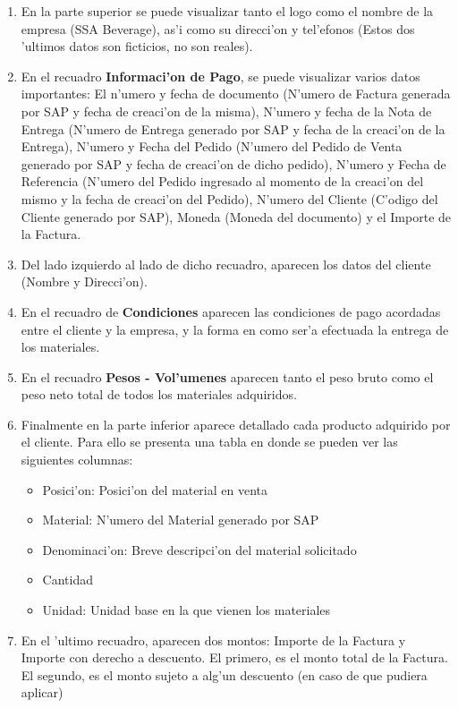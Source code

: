 \begin{enumerate}
\item En la parte superior se puede visualizar tanto el logo como el nombre de la empresa (SSA Beverage), as'i como su direcci'on y tel'efonos (Estos dos 'ultimos datos son ficticios, no son reales).
\item En el recuadro \textbf{Informaci'on de Pago}, se puede visualizar varios datos importantes: El n'umero y fecha de documento (N'umero de Factura generada por SAP y fecha de creaci'on de la misma), N'umero y fecha de la Nota de Entrega (N'umero de Entrega generado por SAP y fecha de la  creaci'on de la Entrega), N'umero y Fecha del Pedido (N'umero del Pedido de Venta generado por SAP y fecha de creaci'on de dicho pedido), N'umero  y Fecha de Referencia (N'umero del Pedido ingresado al momento de la creaci'on del mismo y la fecha de creaci'on del Pedido), N'umero del  Cliente (C'odigo del Cliente generado por SAP), Moneda (Moneda del documento) y el Importe de la Factura.
\item Del lado izquierdo al lado de dicho recuadro, aparecen los datos del cliente (Nombre y Direcci'on).
\item En el recuadro de \textbf{Condiciones} aparecen las condiciones de pago acordadas entre el cliente y la empresa, y la forma en como ser'a efectuada la entrega de los materiales.
\item  En el recuadro \textbf{Pesos - Vol'umenes} aparecen tanto el peso bruto como el peso neto total de todos los materiales adquiridos.
\item Finalmente en la parte inferior aparece detallado cada producto adquirido por el cliente. Para ello se presenta una tabla en donde se pueden ver las siguientes columnas:
\begin{itemize}
\item Posici'on: Posici'on del material en venta
\item Material: N'umero del Material generado por SAP
\item Denominaci'on: Breve descripci'on del material solicitado
\item Cantidad
\item Unidad: Unidad base en la que vienen los materiales
\end{itemize}
\item En el 'ultimo recuadro, aparecen dos montos: Importe de la Factura y Importe con derecho a descuento. El primero, es el monto total de la Factura. El segundo, es el monto sujeto a alg'un descuento (en caso de que pudiera aplicar)
\end{enumerate}
